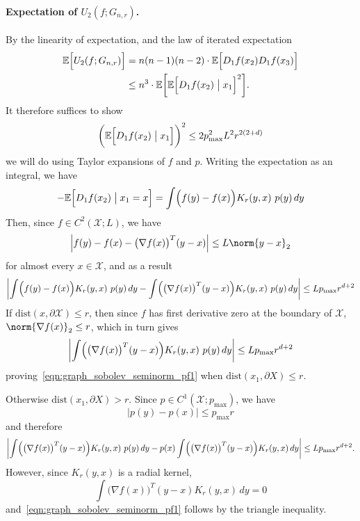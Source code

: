 \documentclass{article}
\newcommand{\abs}[1]{\left \lvert #1 \right \rvert}
\newcommand{\1}{\mathbf{1}}
\newcommand{\Xset}{\mathcal{X}}
\newcommand{\Ebb}{\mathbb{E}}
\theoremstyle{alden}
\theoremstyle{aldenthm}
\theoremstyle{definition}
\theoremstyle{remark}
\begin{document}
\paragraph{Expectation of $U_2(f;G_{n,r})$.}
By the linearity of expectation, and the law of iterated expectation
\begin{align*}
\Ebb\Bigl[U_2(f;G_{n,r})\Bigr] & = n (n - 1) (n - 2) \cdot \Ebb\Bigl[D_1f(x_2) D_1f(x_3)\Bigr] \\
& \leq n^3 \cdot \Ebb\biggl[ \Ebb\Bigl[D_1f(x_2)\bigm|x_1\Bigr]^2 \biggr].
\end{align*}
It therefore suffices to show 
\begin{equation}
\label{eqn:graph_sobolev_seminorm_pf1}
\biggl(\Ebb\Bigl[D_1f(x_2)\bigm|x_1\Bigr]\biggr)^2 \leq 2 p_{\max}^2 L^2 r^{2(2 + d)}
\end{equation}
we will do using Taylor expansions of $f$ and $p$. Writing the expectation as an integral, we have
\begin{equation*}
-\Ebb\Bigl[D_1f(x_2)\bigm|x_1 = x\Bigr] = \int \Bigl(f(y) - f(x)\Bigr)K_r(y,x)~ p(y) \,dy
\end{equation*}
Then, since $f \in C^2(\Xset;L)$, we have
\begin{equation*}
\abs{f(y) - f(x) - \bigl(\nabla f(x)\bigr)^T (y - x)} \leq L \norm{y - x}_2
\end{equation*}
for almost every $x \in \Xset$, and as a result
\begin{equation*}
\abs{\int \Bigl(f(y) - f(x)\Bigr)K_r(y,x)~ p(y) \,dy - \int \Bigl(\bigl(\nabla f(x)\bigr)^T (y - x)\Bigr)K_r(y,x)~ p(y) \,dy} \leq L p_{\max} r^{d + 2}
\end{equation*}
If $\mathrm{dist}(x,\partial \Xset) \leq r$, then since $f$ has first derivative zero at the boundary of $\Xset$, $\norm{\nabla f(x)}_2 \leq r$, which in turn gives
\begin{equation*}
\abs{\int \Bigl(\bigl(\nabla f(x)\bigr)^T (y - x)\Bigr)K_r(y,x)~ p(y) \,dy} \leq L p_{\max} r^{d + 2}
\end{equation*}
proving~\eqref{eqn:graph_sobolev_seminorm_pf1} when $\mathrm{dist}(x_1,\partial X) \leq r$.

Otherwise $\mathrm{dist}(x_1,\partial X) > r$. Since $p \in C^1(\Xset;p_{\max})$, we have
\begin{equation*}
\abs{p(y) - p(x)}  \leq p_{\max} r
\end{equation*}
and therefore
\begin{equation*}
\abs{\int \Bigl(\bigl(\nabla f(x)\bigr)^T (y - x)\Bigr)K_r(y,x)~ p(y) \,dy - p(x) \int \Bigl(\bigl(\nabla f(x)\bigr)^T (y - x)\Bigr)K_r(y,x) \,dy} \leq L p_{\max} r^{d + 2}.
\end{equation*}
However, since $K_r(y,x)$ is a radial kernel,
\begin{equation*}
\int \bigl(\nabla f(x)\bigr)^T (y - x) K_r(y,x)\,dy = 0
\end{equation*} 
and~\eqref{eqn:graph_sobolev_seminorm_pf1} follows by the triangle inequality.
\end{document}
